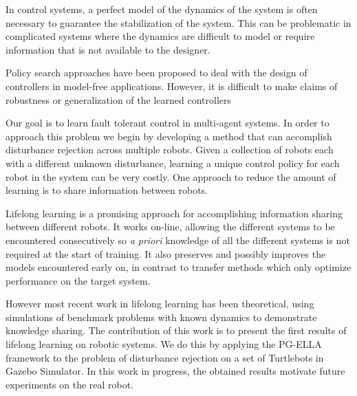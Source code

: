 \documentclass{aamas2016}
\begin{document}
%

In control systems, a perfect model of the dynamics of the system is often necessary to guarantee the stabilization of the system. This can be problematic in complicated systems where the dynamics are difficult to model or require information that is not available to the designer. %


Policy search approaches have been proposed to deal with the design of controllers in model-free applications.
However, it is difficult to make claims of robustness or generalization of the learned controllers 

Our goal is to learn fault tolerant control in multi-agent systems. In order to approach this problem we begin by developing a method that can accomplish disturbance rejection across multiple robots. 
Given a collection of robots each with a different unknown disturbance, learning a unique control policy for each robot in the system can be very costly. One approach to reduce the amount of learning is to share information between robots. 

Lifelong learning \cite{Ruvolo2013} is a promising approach for accomplishing information sharing between different robots. It works on-line, allowing the different systems to be encountered consecutively so \textit{a priori} knowledge of all the different systems is not required at the start of training. It also preserves and possibly improves the models encountered early on, in contrast to transfer methods which only optimize performance on the target system.

However most recent work in lifelong learning \cite{Ruvolo2013,BouAmmar2014a,bouAmmar2015unsupervised} has been theoretical, using simulations of benchmark problems with known dynamics to demonstrate knowledge sharing. The contribution of this work is to present the first results of lifelong learning on robotic systems. We do this by applying the PG-ELLA framework \cite{BouAmmar2014a} to the problem of disturbance rejection on a set of Turtlebots in Gazebo Simulator. In this work in progress, the obtained results motivate future experiments on the real robot. 
\end{document}
